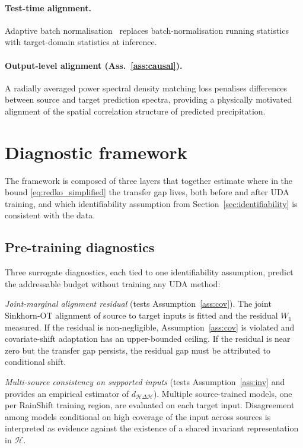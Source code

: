 \documentclass{article}
\begin{document}
\paragraph{Test-time alignment.} Adaptive batch
normalisation~\citep{li2018adabn} replaces batch-normalisation running
statistics with target-domain statistics at inference.

\paragraph{Output-level alignment (Ass.~\ref{ass:causal}).} A radially
averaged power spectral density matching loss penalises differences
between source and target prediction spectra, providing a physically
motivated alignment of the spatial correlation structure of predicted
precipitation.

\section{Diagnostic framework}\label{sec:framework}

The framework is composed of three layers that together estimate where
in the bound \eqref{eq:redko_simplified} the transfer gap lives, both
before and after UDA training, and which identifiability assumption
from Section~\ref{sec:identifiability} is consistent with the data.

\subsection{Pre-training diagnostics}

Three surrogate diagnostics, each tied to one identifiability
assumption, predict the addressable budget without training any UDA
method:

\textit{Joint-marginal alignment residual} (tests
Assumption~\ref{ass:cov}). The joint Sinkhorn-OT alignment of source to
target inputs is fitted and the residual $W_1$ measured. If the
residual is non-negligible, Assumption~\ref{ass:cov} is violated and
covariate-shift adaptation has an upper-bounded ceiling. If the
residual is near zero but the transfer gap persists, the residual gap
must be attributed to conditional shift.

\textit{Multi-source consistency on supported inputs} (tests
Assumption~\ref{ass:inv} and provides an empirical estimator of
$d_{\mathcal{H}\Delta\mathcal{H}}$). Multiple source-trained models, one
per RainShift training region, are evaluated on each target input.
Disagreement among models conditional on high coverage of the input
across sources is interpreted as evidence against the existence of a
shared invariant representation in $\mathcal{H}$.
\end{document}
